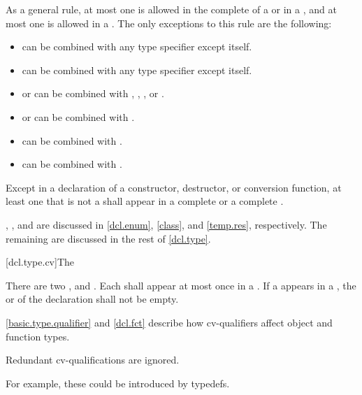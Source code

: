 \pnum
As a general rule, at most one
is allowed in the complete
 of a  or in a
,
and at most one
is allowed in a
.
The only exceptions to this rule are the following:
\begin{itemize}
\item {} can be combined with any type specifier except itself.

\item {} can be combined with any type specifier except itself.

\item {} or  can be combined with
, , , or .

\item {} or  can be combined with .

\item {} can be combined with .

\item {} can be combined with .
\end{itemize}

\pnum
Except in a declaration of a constructor, destructor, or conversion
function, at least one  that is not a
 shall appear in a complete
 or a complete
.

\pnum
\begin{note}
,
,
and
are discussed
in
\ref{dcl.enum},
\ref{class},
and
\ref{temp.res}, respectively. The remaining
 are discussed in the rest of \ref{dcl.type}.
\end{note}

[dcl.type.cv]{The }%
%
%
%

\pnum
There are two ,  and
. Each  shall appear at most once in
a . If a  appears in a
, the 
or  of
the declaration shall not be empty.
\begin{note}
\ref{basic.type.qualifier} and \ref{dcl.fct} describe how cv-qualifiers affect object and
function types.
\end{note}
Redundant cv-qualifications are ignored.
\begin{note}
For example,
these could be introduced by typedefs.
\end{note}

